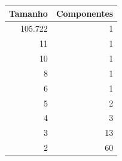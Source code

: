 \begin{tabular}{rr}
\toprule
Tamanho & Componentes \\
\midrule
105.722 & 1 \\
11 & 1 \\
10 & 1 \\
8 & 1 \\
6 & 1 \\
5 & 2 \\
4 & 3 \\
3 & 13 \\
2 & 60 \\
\bottomrule
\end{tabular}
